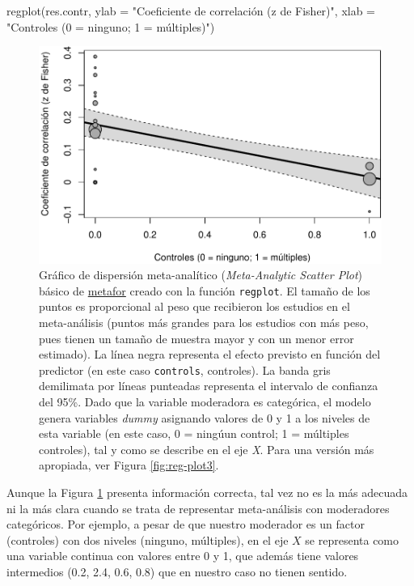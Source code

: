 \documentclass[
  bookmarksnumbered]{article}
\newenvironment{Shaded}{\begin{snugshade}}{\end{snugshade}}
\newcommand{\AttributeTok}[1]{\textcolor[rgb]{0.00,0.34,0.68}{#1}}
\newcommand{\FunctionTok}[1]{\textcolor[rgb]{0.39,0.29,0.61}{#1}}
\newcommand{\NormalTok}[1]{\textcolor[rgb]{0.12,0.11,0.11}{#1}}
\newcommand{\StringTok}[1]{\textcolor[rgb]{0.75,0.01,0.01}{#1}}
\begin{document}
\begin{Shaded}
\begin{Highlighting}[]
\FunctionTok{regplot}\NormalTok{(res.contr,}
        \AttributeTok{ylab =} \StringTok{"Coeficiente de correlación (z de Fisher)"}\NormalTok{,}
        \AttributeTok{xlab =} \StringTok{"Controles (0 = ninguno; 1 = múltiples)"}\NormalTok{)}
\end{Highlighting}
\end{Shaded}

\begin{figure}
\centering
\includegraphics{Meta-analysis_files/figure-latex/reg-plot2-1.pdf}
\caption{\label{fig:reg-plot2}Gráfico de dispersión meta-analítico (\emph{Meta-Analytic Scatter Plot}) básico de \href{https://www.metafor-project.org/doku.php}{metafor} creado con la función \texttt{regplot}. El tamaño de los puntos es proporcional al peso que recibieron los estudios en el meta-análisis (puntos más grandes para los estudios con más peso, pues tienen un tamaño de muestra mayor y con un menor error estimado). La línea negra representa el efecto previsto en función del predictor (en este caso \texttt{controls}, controles). La banda gris demilimata por líneas punteadas representa el intervalo de confianza del 95\%. Dado que la variable moderadora es categórica, el modelo genera variables \emph{dummy} asignando valores de 0 y 1 a los niveles de esta variable (en este caso, 0 = ningúun control; 1 = múltiples controles), tal y como se describe en el eje \emph{X}. Para una versión más apropiada, ver Figura \ref{fig:reg-plot3}.}
\end{figure}

Aunque la Figura \ref{fig:reg-plot2} presenta información correcta, tal vez no es la más adecuada ni la más clara cuando se trata de representar meta-análisis con moderadores categóricos. Por ejemplo, a pesar de que nuestro moderador es un factor (controles) con dos niveles (ninguno, múltiples), en el eje \(X\) se representa como una variable continua con valores entre 0 y 1, que además tiene valores intermedios (0.2, 2.4, 0.6, 0.8) que en nuestro caso no tienen sentido.
\end{document}
